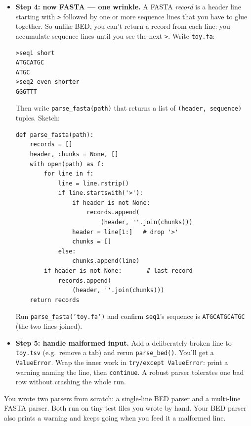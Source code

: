 \begin{itemize}[nosep]
\begin{lstlisting}
print(parse_bed('toy.tsv'))
    \end{lstlisting}
    BED is tab-separated, 0-based, half-open --- those are format conventions, not Python rules.
  \item \textbf{Step 4: now FASTA --- one wrinkle.} A FASTA \textit{record} is a header line starting with \texttt{>} followed by one or more sequence lines that you have to glue together. So unlike BED, you can't return a record from each line: you accumulate sequence lines until you see the next \texttt{>}. Write \texttt{toy.fa}:
    \begin{lstlisting}
>seq1 short
ATGCATGC
ATGC
>seq2 even shorter
GGGTTT
    \end{lstlisting}
    Then write \texttt{parse\_fasta(path)} that returns a list of \texttt{(header, sequence)} tuples. Sketch:
    \begin{lstlisting}
def parse_fasta(path):
    records = []
    header, chunks = None, []
    with open(path) as f:
        for line in f:
            line = line.rstrip()
            if line.startswith('>'):
                if header is not None:
                    records.append(
                        (header, ''.join(chunks)))
                header = line[1:]   # drop '>'
                chunks = []
            else:
                chunks.append(line)
        if header is not None:       # last record
            records.append(
                (header, ''.join(chunks)))
    return records
    \end{lstlisting}
    Run \texttt{parse\_fasta('toy.fa')} and confirm \texttt{seq1}'s sequence is \texttt{ATGCATGCATGC} (the two lines joined).
  \item \textbf{Step 5: handle malformed input.} Add a deliberately broken line to \texttt{toy.tsv} (e.g.\ remove a tab) and rerun \texttt{parse\_bed()}. You'll get a \texttt{ValueError}. Wrap the inner work in \texttt{try/except ValueError}: print a warning naming the line, then \texttt{continue}. A robust parser tolerates one bad row without crashing the whole run.
\end{itemize}
\begin{winbox}[Checkpoint]
You wrote two parsers from scratch: a single-line BED parser and a multi-line FASTA parser. Both run on tiny test files you wrote by hand. Your BED parser also prints a warning and keeps going when you feed it a malformed line.
\end{winbox}

